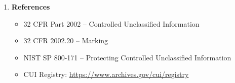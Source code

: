 \documentclass[11pt,letterpaper]{article}
\newcommand{\dmsection}[1]{\item \textbf{#1}\par}
\begin{document}
\begin{enumerate}
\dmsection{References}

\begin{itemize}
    \item 32 CFR Part 2002 -- Controlled Unclassified Information
    \item 32 CFR 2002.20 -- Marking
    \item NIST SP 800-171 -- Protecting Controlled Unclassified Information
    \item CUI Registry: \url{https://www.archives.gov/cui/registry}
\end{itemize}

\end{enumerate}
\end{document}
